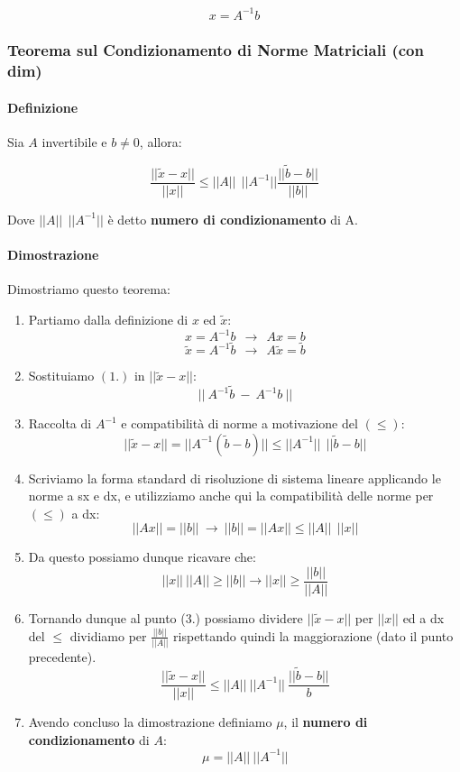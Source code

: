 \documentclass{article}
\begin{document}
\[ x = A^{-1}b \]

\subsubsection{Teorema sul Condizionamento di Norme Matriciali (con dim)} 

\paragraph{Definizione} Sia $A$ invertibile e $b \neq 0$, allora:

\[ \frac{||\tilde{x}-x||}{||x||} \leq ||A||\:\:||A^{-1}|| \frac{||\tilde{b}-b||}{||b||} \]

Dove $||A||\:\:||A^{-1}||$ è detto \textbf{numero di condizionamento} di A.

\newpage

\paragraph{Dimostrazione} Dimostriamo questo teorema:

\begin{enumerate}
    \item Partiamo dalla definizione di $x$ ed $\tilde{x}$:
    \[ x = A^{-1}b \: \:\rightarrow \: \: Ax = b\]
    \[ \tilde{x} = A^{-1}\tilde{b} \: \:\rightarrow \: \: A\tilde{x} = \tilde{b}\]
    \item Sostituiamo $(1.)$ in $||\tilde{x}-x||$:
    \[ || \: A^{-1}\tilde{b} \: - \: A^{-1}{b} \: || \]
    \item Raccolta di $A^{-1}$ e compatibilità di norme a motivazione del $(\leq)$:
    \[ ||\tilde{x} - x|| = ||A^{-1}(\tilde{b}-b)|| \leq ||A^{-1}|| \: \: ||\tilde{b}-b|| \]
    \item Scriviamo la forma standard di risoluzione di sistema lineare applicando le norme a sx e dx, e utilizziamo anche qui la compatibilità delle norme per $(\leq)$ a dx:
    \[ ||Ax|| = ||b|| \: \rightarrow \: ||b|| = ||Ax|| \leq ||A|| \: \: ||x|| \]
    \item Da questo possiamo dunque ricavare che:
    \[ ||x|| \: ||A|| \geq  ||b|| \rightarrow ||x|| \geq \frac{||b||}{||A||} \]
    \item Tornando dunque al punto (3.) possiamo dividere $||\tilde{x} - x||$ per $||x||$ ed a dx del $\leq$ dividiamo per $\frac{||b||}{||A||}$ rispettando quindi la maggiorazione (dato il punto precedente).
    \[ \frac{||\tilde{x}-x||}{||x||} \leq ||A|| \: ||A^{-1}|| \: \frac{||\tilde{b}-b||}{b} \] 
    \item Avendo concluso la dimostrazione definiamo $\mu$, il \textbf{numero di condizionamento} di $A$:
    \[ \mu = ||A||\:||A^{-1}|| \]
\end{enumerate}
\end{document}
